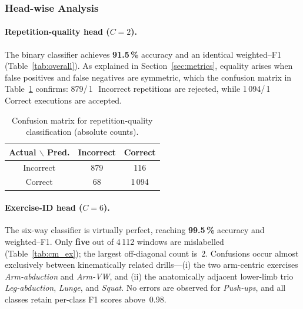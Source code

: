 \documentclass{article}
\begin{document}
\subsubsection{Head-wise Analysis}

\paragraph{Repetition-quality head ($C\!=\!2$).}
The binary classifier achieves \textbf{91.5\,\%} accuracy and an
identical weighted–F1 (Table~\ref{tab:overall}).  As explained in
Section~\ref{sec:metrics}, equality arises when false positives and false
negatives are symmetric, which the confusion matrix in
Table~\ref{tab:cm_rep} confirms: 879/\,1\,\, Incorrect
repetitions are rejected, while 1\,094/\,1\,\, Correct
executions are accepted.

\begin{table}[h]
  \centering\small
  \caption{Confusion matrix for repetition-quality classification
           (absolute counts).}
  \label{tab:cm_rep}
  \begin{tabular}{@{}c|cc@{}}
    \toprule
    \textbf{Actual $\backslash$ Pred.} & \textbf{Incorrect} & \textbf{Correct} \\
    \midrule
    Incorrect & 879 & 116 \\
    Correct   &  68 & 1\,094 \\
    \bottomrule
  \end{tabular}
\end{table}

\paragraph{Exercise-ID head ($C\!=\!6$).}
The six-way classifier is virtually perfect, reaching
\textbf{99.5\,\%} accuracy and weighted–F1.  Only \textbf{five} out of
4\,112 windows are mislabelled (Table~\ref{tab:cm_ex}); the largest
off-diagonal count is~2.  Confusions occur almost exclusively between
kinematically related drills—(i) the two arm-centric exercises
\emph{Arm-abduction} and \emph{Arm-VW}, and (ii) the anatomically
adjacent lower-limb trio \emph{Leg-abduction}, \emph{Lunge}, and
\emph{Squat}.  No errors are observed for \emph{Push-ups}, and all
classes retain per-class F1 scores above~0.98.
\end{document}
